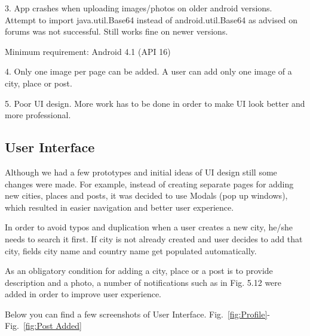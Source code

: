 3. App crashes when uploading images/photos on older android versions.
Attempt to import java.util.Base64 instead of android.util.Base64 as advised on forums was not successful.
Still works fine on newer versions. 

Minimum requirement: Android 4.1 (API 16) 

4. Only one image per page can be added.  
A user can add only one image of a city, place or post.

5. Poor UI design.
More work has to be done in order to make UI look better and more professional.


\subsection{User Interface}

Although we had a few prototypes and initial ideas of UI design still some changes were made.
For example, instead of creating separate pages for adding new cities, places and posts, it was decided to use Modals (pop up windows), which resulted in easier navigation and better user experience. 

In order to avoid typos and duplication when a user creates a new city, he/she needs to search it first. If city is not already created and user decides to add that city, fields city name and country name get populated automatically. 

As an obligatory condition for adding a city, place or a post is to provide description and a photo, a number of notifications such as in Fig. 5.12 were added in order to improve user experience.

Below you can find a few screenshots of User Interface.
Fig.~\ref{fig:Profile}-Fig.~\ref{fig:Post Added}

